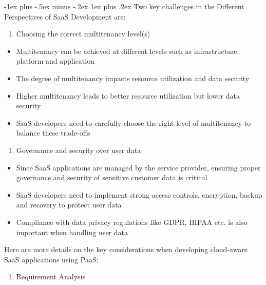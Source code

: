 \documentclass[10pt, landscape]{article}
\makeatletter
\renewcommand{\subsubsection}{\@startsection{subsubsection}{3}{0mm}%
  {-1ex plus -.5ex minus -.2ex}%
  {1ex plus .2ex}%
{\normalfont\small\bfseries}}%
\makeatother
\begin{document}
\begin{multicols*}{4}
\subsubsection{Two key challenges in the Different Perspectives of SaaS
Development
are:}\label{two-key-challenges-in-the-different-perspectives-of-saas-development-are}

\begin{enumerate}
\def\labelenumi{\arabic{enumi}.}
\tightlist
\item
  Choosing the correct multitenancy level(s)
\end{enumerate}

\begin{itemize}
\tightlist
\item
  Multitenancy can be achieved at different levels such as
  infrastructure, platform and application
\item
  The degree of multitenancy impacts resource utilization and data
  security
\item
  Higher multitenancy leads to better resource utilization but lower
  data security
\item
  SaaS developers need to carefully choose the right level of
  multitenancy to balance these trade-offs
\end{itemize}

\begin{enumerate}
\def\labelenumi{\arabic{enumi}.}
\setcounter{enumi}{1}
\tightlist
\item
  Governance and security over user data
\end{enumerate}

\begin{itemize}
\tightlist
\item
  Since SaaS applications are managed by the service provider, ensuring
  proper governance and security of sensitive customer data is critical
\item
  SaaS developers need to implement strong access controls, encryption,
  backup and recovery to protect user data
\item
  Compliance with data privacy regulations like GDPR, HIPAA etc. is also
  important when handling user data
\end{itemize}

Here are more details on the key considerations when developing
cloud-aware SaaS applications using PaaS:

\begin{enumerate}
\def\labelenumi{\arabic{enumi}.}
\tightlist
\item
  Requirement Analysis
\end{enumerate}


\end{multicols*}
\end{document}
